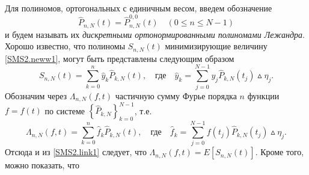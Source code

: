 %



Для полиномов, ортогональных с единичным весом, введем обозначение $$\hat{P}_{n,N}(t) = \hat{P}^{0,0}_{n,N}(t) \quad (0 \leq n \leq N-1)$$  и будем называть их \textit{дискретными ортонормированными полиномами Лежандра}.
Хорошо известно, что полиномы $S_{n,N}(t)$ минимизирующие величину \eqref{SMS2.neww1}, могут быть представлены следующим образом
\begin{equation*}
S_{n,N}(t) = \sum\limits_{k=0}^{n} \hat{y}_k \hat{P}_{k,N}(t), \quad \text{где} \quad \hat{y}_k = \sum\limits_{j=0}^{N-1} y_j \hat{P}_{k,N}(t_j)\vartriangle\eta_{j}.
\end{equation*}
Обозначим через $\Lambda_{n,N}(f,t)$ частичную сумму Фурье порядка $n$ функции $f=f(t)$ по системе $\left\{ \hat{P}_{k,N} \right\}_{k=0}^{N-1}$, т.е.
\begin{equation*}
\Lambda_{n,N}(f,t) = \sum\limits_{k=0}^{n} \hat{f}_k \hat{P}_{k,N}(t), \quad \text{где} \quad \hat{f}_k = \sum\limits_{j=0}^{N-1} f(t_j) \hat{P}_{k,N}(t_j)\vartriangle\eta_{j}.
\end{equation*}
Отсюда и из \eqref{SMS2.link1} следует, что $\Lambda_{n,N}(f,t) = E \left[ S_{n,N}(t) \right]$. Кроме того, можно показать, что %

